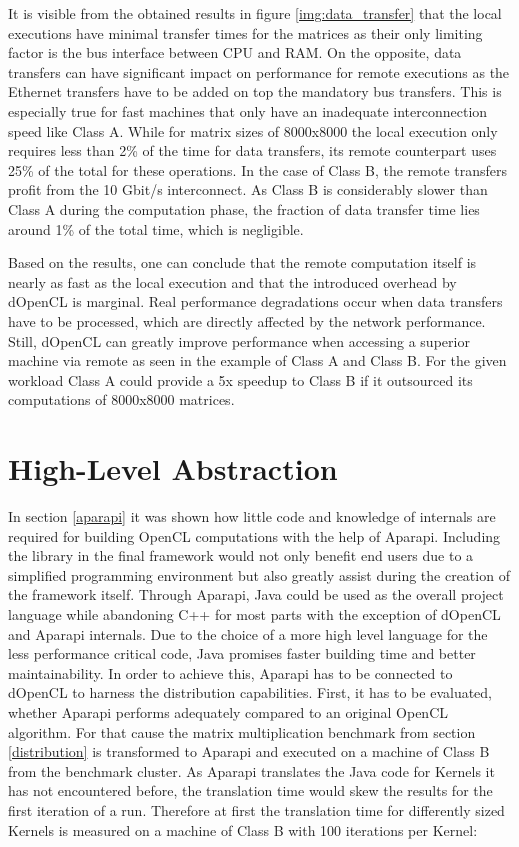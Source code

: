 It is visible from the obtained results in figure \ref{img:data_transfer} that the local executions have minimal transfer times for the matrices as their only limiting factor is the bus interface between CPU and RAM. On the opposite, data transfers can have significant impact on performance for remote executions as the Ethernet transfers have to be added on top the mandatory bus transfers. This is especially true for fast machines that only have an inadequate interconnection speed like Class A. While for matrix sizes of 8000x8000 the local execution only requires less than 2\% of the time for data transfers, its remote counterpart uses 25\% of the total for these operations. In the case of Class B, the remote transfers profit from the 10 Gbit/s interconnect. As Class B is considerably slower than Class A during the computation phase, the fraction of data transfer time lies around 1\% of the total time, which is negligible.

Based on the results, one can conclude that the remote computation itself is nearly as fast as the local execution and that the introduced overhead by dOpenCL is marginal. Real performance degradations occur when data transfers have to be processed, which are directly affected by the network performance. Still, dOpenCL can greatly improve performance when accessing a superior machine via remote as seen in the example of Class A and Class B. For the given workload Class A could provide a 5x speedup to Class B if it outsourced its computations of 8000x8000 matrices.

\section{High-Level Abstraction}
\label{abstraction}

In section \ref{aparapi} it was shown how little code and knowledge of internals are required for building OpenCL computations with the help of Aparapi. Including the library in the final framework would not only benefit end users due to a simplified programming environment but also greatly assist during the creation of the framework itself. Through Aparapi, Java could be used as the overall project language while abandoning C++ for most parts with the exception of dOpenCL and Aparapi internals. Due to the choice of a more high level language for the less performance critical code, Java promises faster building time and better maintainability. In order to achieve this, Aparapi has to be connected to dOpenCL to harness the distribution capabilities. First, it has to be evaluated, whether Aparapi performs adequately compared to an original OpenCL algorithm. For that cause the matrix multiplication benchmark from section \ref{distribution} is transformed to Aparapi and executed on a machine of Class B from the benchmark cluster. As Aparapi translates the Java code for Kernels it has not encountered before, the translation time would skew the results for the first iteration of a run. Therefore at first the translation time for differently sized Kernels is measured on a machine of Class B with 100 iterations per Kernel:

